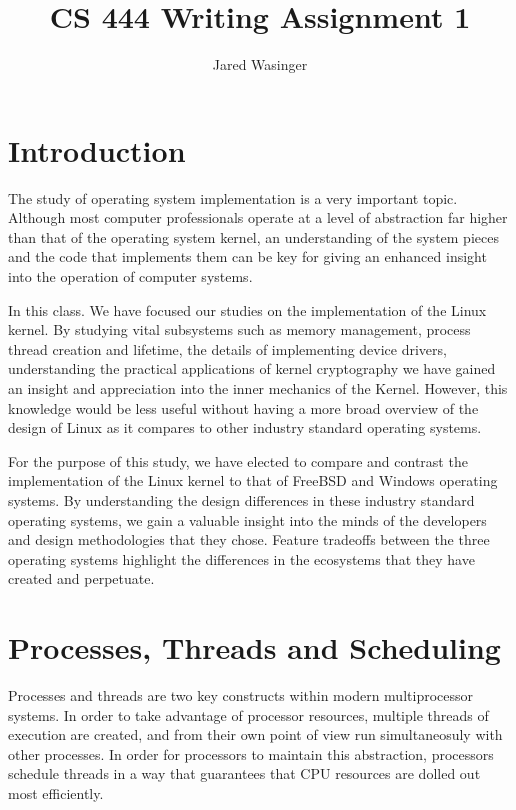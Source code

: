 \documentclass[onecolumn,10pt]{IEEETran}
\title{CS 444 Writing Assignment 1}
\author{Jared Wasinger}
\begin{document}
\maketitle


\section{Introduction}
The study of operating system implementation is a very important topic.  Although most computer professionals operate at a level of abstraction far higher than that of the operating system kernel, an understanding of the system pieces and the code that implements them can be key for giving an enhanced insight into the operation of computer systems.

In this class.  We have focused our studies on the implementation of the Linux kernel.  By studying vital subsystems such as memory management, process thread creation and lifetime, the details of implementing device drivers, understanding the practical applications of kernel cryptography we have gained an insight and appreciation into the inner mechanics of the Kernel.  However, this knowledge would be less useful without having a more broad overview of the design of Linux as it compares to other industry standard operating systems.

For the purpose of this study, we have elected to compare and contrast the implementation of the Linux kernel to that of FreeBSD and Windows operating systems.  By understanding the design differences in these industry standard operating systems, we gain a valuable insight into the minds of the developers and design methodologies that they chose.  Feature tradeoffs between the three operating systems highlight the differences in the ecosystems that they have created and perpetuate.

\section{Processes, Threads and Scheduling}
Processes and threads are two key constructs within modern multiprocessor systems.  In order to take advantage of processor resources, multiple threads of execution are created, and from their own point of view run simultaneosuly with other processes.  In order for processors to maintain this abstraction, processors schedule threads in a way that guarantees that CPU resources are dolled out most efficiently.
\end{document}
